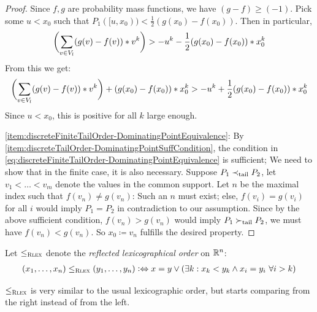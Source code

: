 \documentclass[a4paper]{scrreprt}
\begin{document}
\begin{proof}
        Since $f, g$ are probability mass functions, we have $(g-f) \geq (-1)$. 
        Pick some $u < x_0$ such that $P_1([u, x_0)) < \frac{1}{2}(g(x_0) - f(x_0))$.
        Then in particular, 
        \begin{gather*}
            \biggl(\sum_{v \in V_l} (g(v) - f(v))*v^k\biggr) > -u^k - \frac{1}{2}(g(x_0) - f(x_0))*x_0^k
        \end{gather*}
        From this we get:
        \begin{multline*}
           \biggl(\sum_{v \in V_l} (g(v) - f(v))*v^k\biggr) + (g(x_0) - f(x_0))*x_0^k
           > -u^k + \frac{1}{2}(g(x_0) - f(x_0))*x_0^k
        \end{multline*}
        Since $u < x_0$, this is positive for all $k$ large enough.
        
        \ref{item:discreteFiniteTailOrder-DominatingPointEquivalence}:
        By \ref{item:discreteTailOrder-DominatingPointSuffCondition}, the condition in \eqref{eq:discreteFiniteTailOrder-DominatingPointEquivalence} is sufficient; We need to show that in the finite case, it is also necessary.
        Suppose $P_1 \prec_{\text{tail}} P_2$, let $v_1 < \dots < v_m$ denote the values in the common support.
        Let $n$ be the maximal index such that $f(v_n) \neq g(v_n)$: Such an $n$ must exist; else, $f(v_i) = g(v_i)$ for all $i$ would imply $P_1 = P_2$ in contradiction to our assumption.
        Since by the above sufficient condition, $f(v_n) > g(v_n)$ would imply $P_1 \succ_{\text{tail}} P_2$, we must have $f(v_n) < g(v_n)$. So $x_0 \coloneqq v_n$ fulfills the desired property.
    \end{proof}

    \begin{defn}
        Let $\leq_{\textsc{Rlex}}$ denote the \emph{reflected lexicographical order} on $\mathbb{R}^n$:
        \begin{gather*}
            (x_1, \dots, x_n) \leq_{\textsc{Rlex}} (y_1, \dots, y_n) \mathrel{\vcentcolon\Leftrightarrow} x = y \vee (\exists k: x_k < y_k \wedge x_i = y_i ~\forall i > k)
        \end{gather*}
    \end{defn}
    $\leq_{\textsc{Rlex}}$ is very similar to the usual lexicographic order, but starts comparing from the right instead of from the left.
    
\end{document}
